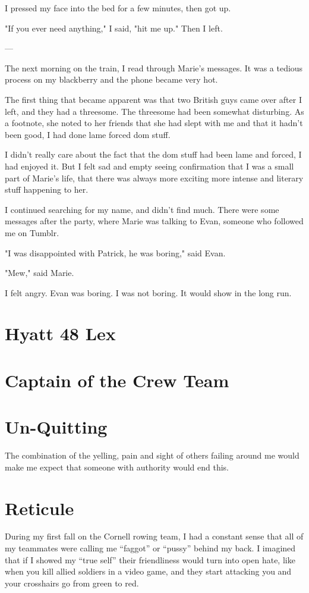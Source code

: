 \documentclass[12pt]{article}
\begin{document}
I pressed my face into the bed for a few minutes, then got up.

"If you ever need anything," I said, "hit me up."  Then I left.

---

The next morning on the train, I read through Marie's messages.  It was a
tedious process on my blackberry and the phone became very hot. 

The first thing that became apparent was that two British guys came over
after I left, and they had a threesome.  The threesome had been somewhat
disturbing.  As a footnote, she noted to her friends that she had slept with me
and that it hadn't been good, I had done lame forced dom stuff.

I didn't really care about the fact that the dom stuff had been lame and forced,
I had enjoyed it.  But I felt sad and empty seeing confirmation that I was a small part of
Marie's life, that there was always more exciting more intense and literary
stuff happening to her.

I continued searching for my name, and didn't find much.  There were some
messages after the party, where Marie was talking to Evan, someone who followed
me on Tumblr.

"I was disappointed with Patrick, he was boring," said Evan.

"Mew," said Marie.

I felt angry.  Evan was boring.  I was not boring.  It would show in the long
run. 
            
\section{Hyatt 48 Lex}

\section{Captain of the Crew Team}


\section{Un-Quitting}
The combination of the yelling, pain and sight of others failing around me would
make me expect that someone with authority would end this.


\section{Reticule}
During my first fall on the Cornell rowing team, I had a constant sense that
all of my teammates were calling me ``faggot'' or ``pussy'' behind my back.  I
imagined that if I showed my ``true self'' their friendliness would turn into
open hate, like when you kill allied soldiers in a video game, and they start
attacking you and your crosshairs go from green to red.  
\end{document}
